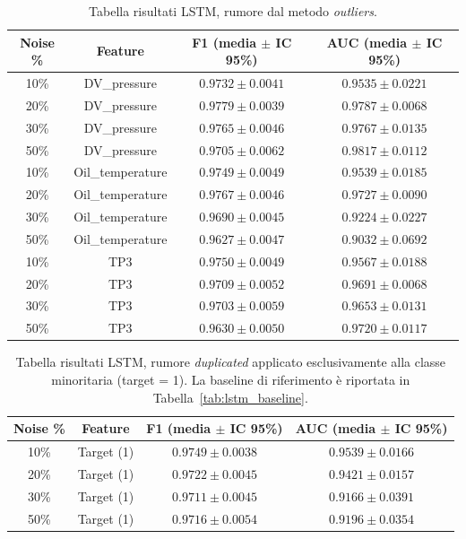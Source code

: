 \documentclass[../main.tex]{subfiles}
\begin{document}
\begin{table}[H]
\centering\small
{}
\begin{tabular}{cccc}
\toprule
\textbf{Noise \%} & \textbf{Feature} & \textbf{F1 (media $\pm$ IC 95\%)} & \textbf{AUC (media $\pm$ IC 95\%)} \\
\midrule
10\% & DV\_pressure     & $0.9732 \pm 0.0041$ & $0.9535 \pm 0.0221$ \\
20\% & DV\_pressure     & $0.9779 \pm 0.0039$ & $0.9787 \pm 0.0068$ \\
30\% & DV\_pressure     & $0.9765 \pm 0.0046$ & $0.9767 \pm 0.0135$ \\
50\% & DV\_pressure     & $0.9705 \pm 0.0062$ & $0.9817 \pm 0.0112$ \\
\midrule
10\% & Oil\_temperature & $0.9749 \pm 0.0049$ & $0.9539 \pm 0.0185$ \\
20\% & Oil\_temperature & $0.9767 \pm 0.0046$ & $0.9727 \pm 0.0090$ \\
30\% & Oil\_temperature & $0.9690 \pm 0.0045$ & $0.9224 \pm 0.0227$ \\
50\% & Oil\_temperature & $0.9627 \pm 0.0047$ & $0.9032 \pm 0.0692$ \\
\midrule
10\% & TP3             & $0.9750 \pm 0.0049$ & $0.9567 \pm 0.0188$ \\
20\% & TP3             & $0.9709 \pm 0.0052$ & $0.9691 \pm 0.0068$ \\
30\% & TP3             & $0.9703 \pm 0.0059$ & $0.9653 \pm 0.0131$ \\
50\% & TP3             & $0.9630 \pm 0.0050$ & $0.9720 \pm 0.0117$ \\
\bottomrule
\end{tabular}
\caption{Tabella risultati LSTM, rumore dal metodo \textit{outliers}.}
\label{tab:lstm_outliers}
\end{table}
\begin{table}[H]
\centering\small
{}
\begin{tabular}{cccc}
\toprule
\textbf{Noise \%} & \textbf{Feature} & \textbf{F1 (media $\pm$ IC 95\%)} & \textbf{AUC (media $\pm$ IC 95\%)} \\
\midrule
10\% & Target (1) & $0.9749 \pm 0.0038$ & $0.9539 \pm 0.0166$ \\
20\% & Target (1) & $0.9722 \pm 0.0045$ & $0.9421 \pm 0.0157$ \\
30\% & Target (1) & $0.9711 \pm 0.0045$ & $0.9166 \pm 0.0391$ \\
50\% & Target (1) & $0.9716 \pm 0.0054$ & $0.9196 \pm 0.0354$ \\
\bottomrule
\end{tabular}
\caption{Tabella risultati LSTM, rumore \textit{duplicated} applicato
esclusivamente alla classe minoritaria (target = 1).
La baseline di riferimento è riportata in Tabella~\ref{tab:lstm_baseline}.}
\label{tab:lstm_new_duplicated_minority}
\end{table}
\end{document}
